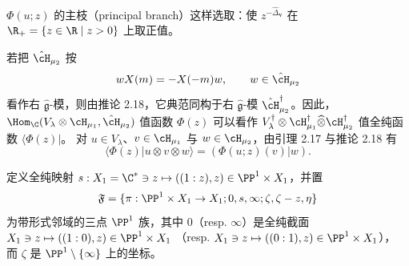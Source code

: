 
$\Phi(u;z)$ 的主枝（principal branch）这样选取：使 $z^{-\hat{\Delta}_{\mathbf{v}}}$
在 $\R_+=\{z\in\R\mid z>0\}$ 上取正值。


若把 $\hat{\cH}_{\mu_2}$ 按
\[
wX(m)=-X(-m)w,\qquad w\in\hat{\cH}_{\mu_2}
\]
看作右 $\hat{\mathfrak{g}}$-模，则由推论 2.18，它典范同构于右
$\hat{\mathfrak{g}}$-模 $\hat{\cH}^{\dagger}_{\mu_2}$。因此，
$\Hom_\C(V_\lambda\otimes\cH_{\mu_1},\hat{\cH}_{\mu_2})$ 值函数 $\Phi(z)$
可以看作 $V^{\dagger}_\lambda\otimes\cH^{\dagger}_{\mu_1}
\widehat{\otimes}\cH^{\dagger}_{\mu_2}$ 值全纯函数 $\langle\Phi(z)|$。
对 $u\in V_\lambda$、$v\in\cH_{\mu_1}$ 与 $w\in\cH_{\mu_2}$，由引理 2.17
与推论 2.18 有
\begin{equation}
\langle\Phi(z)|u\otimes v\otimes w\rangle=(\Phi(u;z)(v)|w). \tag{6.23}
\end{equation}


定义全纯映射 $s:X_1=\C^*\ni z\mapsto((1:z),z)\in\PP^1\times X_1$，并置
\[
\mathfrak{F}=\{\pi:\PP^1\times X_1\to X_1;0,s,\infty;\zeta,\zeta-z,\eta\}
\]
为带形式邻域的三点 $\PP^1$ 族，其中 $0$（resp. $\infty$）是全纯截面
$X_1\ni z\mapsto((1:0),z)\in\PP^1\times X_1$
（resp. $X_1\ni z\mapsto((0:1),z)\in\PP^1\times X_1$），
而 $\zeta$ 是 $\PP^1\setminus\{\infty\}$ 上的坐标。



